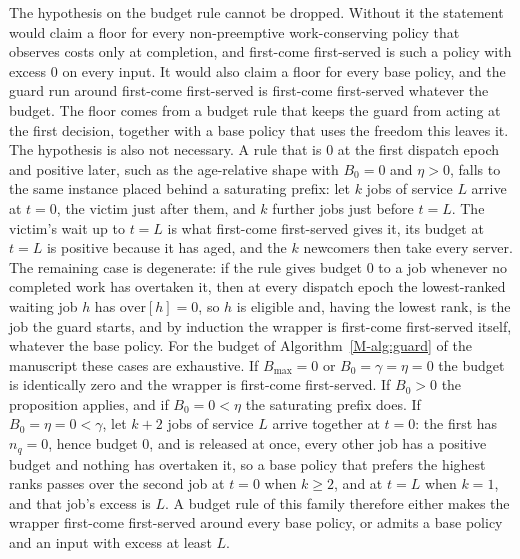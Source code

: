 \documentclass[mathematics,supfile,submit,moreauthors]{Definitions/mdpi}
\begin{document}
The hypothesis on the budget rule cannot be dropped. Without it the statement would
claim a floor for every non-preemptive work-conserving policy that observes costs only at
completion, and first-come first-served is such a policy with excess $0$ on every input.
It would also claim a floor for every base policy, and the guard run around first-come
first-served is first-come first-served whatever the budget. The floor comes from a budget
rule that keeps the guard from acting at the first decision, together with a base policy
that uses the freedom this leaves it.
The hypothesis is also not necessary. A rule that is $0$ at the first dispatch epoch and
positive later, such as the age-relative shape with $B_0 = 0$ and $\eta > 0$,
falls to the same instance placed behind a saturating prefix: let $k$ jobs
of service $L$ arrive at $t = 0$, the victim just after them, and $k$ further
jobs just before $t = L$. The victim's wait up to $t = L$ is what first-come
first-served gives it, its budget at $t = L$ is positive because it has aged,
and the $k$ newcomers then take every server. The remaining case is degenerate:
if the rule gives budget $0$ to a job whenever no completed work has overtaken
it, then at every dispatch epoch the lowest-ranked waiting job $h$ has
$\mathrm{over}[h] = 0$, so $h$ is eligible and, having the lowest rank, is the job
the guard starts, and by induction the wrapper is first-come first-served itself,
whatever the base policy. For the budget of Algorithm~\ref*{M-alg:guard} of the manuscript these cases
are exhaustive. If $B_{\max} = 0$ or $B_0 = \gamma = \eta = 0$ the budget is
identically zero and the wrapper is first-come first-served. If $B_0 > 0$ the
proposition applies, and if $B_0 = 0 < \eta$ the saturating prefix does. If
$B_0 = \eta = 0 < \gamma$, let $k+2$ jobs of service $L$ arrive together at
$t = 0$: the first has $n_q = 0$, hence budget $0$, and is released at once,
every other job has a positive budget and nothing has overtaken it, so a base
policy that prefers the highest ranks passes over the second job at $t = 0$ when
$k \ge 2$, and at $t = L$ when $k = 1$, and that job's excess is $L$. A budget
rule of this family therefore either makes the wrapper first-come first-served
around every base policy, or admits a base policy and an input with excess at
least $L$.

\end{document}
